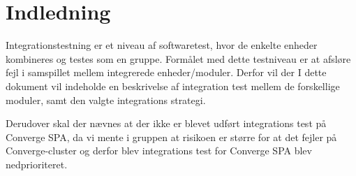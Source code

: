 \chapter{Indledning}

Integrationstestning er et niveau af softwaretest, hvor de enkelte enheder kombineres og testes som en gruppe. Formålet med dette testniveau er at afsløre fejl i samspillet mellem integrerede enheder/moduler. Derfor vil der I dette dokument vil indeholde en beskrivelse af integration test mellem de forskellige moduler, samt den valgte integrations strategi.

Derudover skal der nævnes at der ikke er blevet udført integrations test på Converge SPA, da vi mente i gruppen at risikoen er større for at det fejler på Converge-cluster og derfor blev integrations test for Converge SPA blev nedprioriteret.
